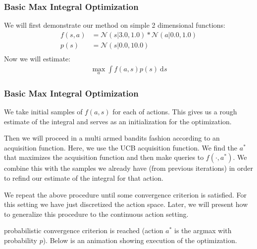 \documentclass[8pt]{beamer}
\begin{document}
\begin{frame}
\frametitle{Basic Max Integral Optimization}
We will first demonstrate our method on simple 2 dimensional functions:
\begin{equation*}
\begin{split}
   f(s,a) &= \mathcal{N}(s | 3.0, 1.0) * \mathcal{N}(a | 0.0, 1.0) \\
   p(s) &= \mathcal{N}(s | 0.0, 10.0) \\
\end{split}
\end{equation*}
Now we will estimate:
\begin{equation*}
\begin{split}
   \max_{a} \int f(a,s) p(s) \ \text{d}s
\end{split}
\end{equation*}
\end{frame}

\begin{frame}
\frametitle{Basic Max Integral Optimization}
We take initial samples of $f(a,s)$ for each of actions. This gives us a rough estimate of the integral and serves as an initialization for the optimization.\newline \newline

Then we will proceed in a multi armed bandits fashion according to an acquisition function. Here, we use the UCB acquisition function. We find the $a^*$ that maximizes the acquisition function and then make queries to $f(\cdot , a^*)$. We combine this with the samples we already have (from previous iterations) in order to refind our estimate of the integral for that action.\newline \newline

We repeat the above procedure until some convergence criterion is satisfied. For this setting we have just discretized the action space. Later, we will present how to generalize this procedure to the continuous action setting.\newline \newline

probabilistic convergence criterion is reached (action $a^*$ is the argmax with probability $p$). Below is an animation showing execution of the optimization.
\end{frame}
\end{document}
